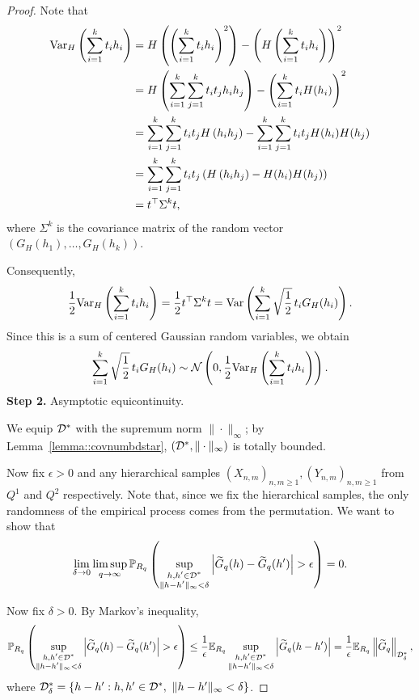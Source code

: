 \begin{proof}
Note that
\begin{align*}
    \mathrm{Var}_H\left( \sum_{i = 1}^k t_i h_i\right)
    &= H\left(\left(\sum_{i = 1}^k t_i h_i \right)^2\right)
    - \left(H \left( \sum_{i = 1}^k t_i h_i\right) \right)^2 \\
    &= H \left( \sum_{i = 1}^k \sum_{j = 1}^k t_i t_j h_i h_j\right)
    - \left( \sum_{i = 1}^k t_i H(h_i) \right)^2 \\
    &= \sum_{i = 1}^k \sum_{j = 1}^k t_i t_j H\left(h_i h_j\right)
    - \sum_{i = 1}^k \sum_{j = 1}^k t_i t_j H(h_i) H(h_j) \\
    &= \sum_{i = 1}^k \sum_{j = 1}^k
    t_i t_j \left( H\left(h_i h_j\right) - H(h_i) H(h_j) \right) \\
    &= t^\top \Sigma^k t,
\end{align*}
where $\Sigma^k$ is the covariance matrix of the random vector
$\left(G_H\left(h_1\right),\dots, G_H\left(h_k\right)\right)$.

Consequently,
\[
\frac{1}{2}\mathrm{Var}_H\left( \sum_{i = 1}^k t_i h_i\right)
= \frac{1}{2} t^\top \Sigma^k t
= \mathrm{Var}\left( \sum_{i = 1}^k \sqrt{\frac{1}{2}}\,t_i G_H(h_i)\right).
\]
Since this is a sum of centered Gaussian random variables, we obtain
\[
\sum_{i = 1}^k \sqrt{\frac{1}{2}}\,t_i G_H(h_i)
\sim
\mathcal{N}\left(0, \frac{1}{2}\mathrm{Var}_H\left( \sum_{i = 1}^k t_i h_i\right) \right).
\]
\textbf{Step 2.} Asymptotic equicontinuity.


We equip $\mathcal{D}^*$ with the supremum norm $\|\cdot\|_\infty$; by Lemma~\ref{lemma::covnumbdstar}, $(\mathcal{D}^*, \|\cdot\|_\infty)$ is totally bounded.

Now fix $\epsilon > 0$ and any hierarchical samples $(X_{n,m})_{n,m\geq1}, (Y_{n,m})_{n,m\geq1}$ from $Q^1$ and $Q^2$ respectively. Note that, since we fix the hierarchical samples, the only randomness of the empirical process comes from the permutation. We want to show that
\[
\lim_{\delta \to 0}\limsup_{q\to\infty}\mathbb{P}_{R_q}\left(
\sup_{\substack{h,h'\in\mathcal{D}^* \\ \|h-h'\|_\infty < \delta}}
\left| \widetilde{G}_q(h) - \widetilde{G}_q(h') \right| > \epsilon
\right) = 0.
\]

Now fix $\delta > 0$. By Markov's inequality,
\[
\mathbb{P}_{R_q}\left(
\sup_{\substack{h,h'\in\mathcal{D}^* \\ \|h-h'\|_\infty < \delta}}
\left| \widetilde{G}_q(h) - \widetilde{G}_q(h') \right| > \epsilon
\right)
\leq \frac{1}{\epsilon}\mathbb{E}_{R_q}\sup_{\substack{h,h'\in\mathcal{D}^* \\ \|h-h'\|_\infty < \delta}}
\left| \widetilde{G}_q(h-h') \right|
= \frac{1}{\epsilon} \mathbb{E}_{R_q}\left\| \widetilde{G}_q \right\|_{\mathcal{D}^*_\delta},
\]
where $\mathcal{D}^*_\delta = \{ h - h' : h,h'\in\mathcal{D}^*,\ \|h - h'\|_\infty < \delta\}$.


\end{proof}
